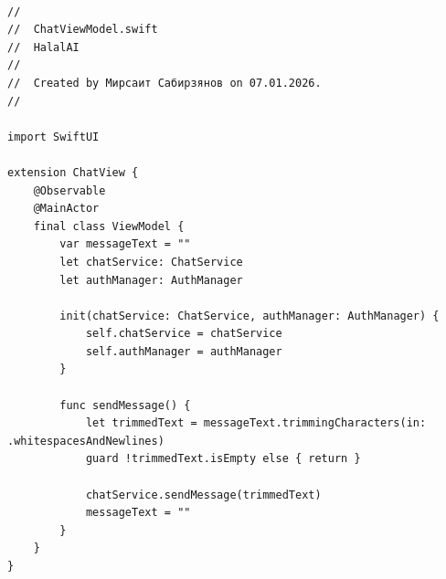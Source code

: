 \begin{lstlisting}[basicstyle=\tiny\ttfamily,breaklines=true]

//
//  ChatViewModel.swift
//  HalalAI
//
//  Created by Мирсаит Сабирзянов on 07.01.2026.
//

import SwiftUI

extension ChatView {
    @Observable
    @MainActor
    final class ViewModel {
        var messageText = ""
        let chatService: ChatService
        let authManager: AuthManager

        init(chatService: ChatService, authManager: AuthManager) {
            self.chatService = chatService
            self.authManager = authManager
        }
        
        func sendMessage() {
            let trimmedText = messageText.trimmingCharacters(in: .whitespacesAndNewlines)
            guard !trimmedText.isEmpty else { return }
            
            chatService.sendMessage(trimmedText)
            messageText = ""
        }
    }
}
\end{lstlisting}

